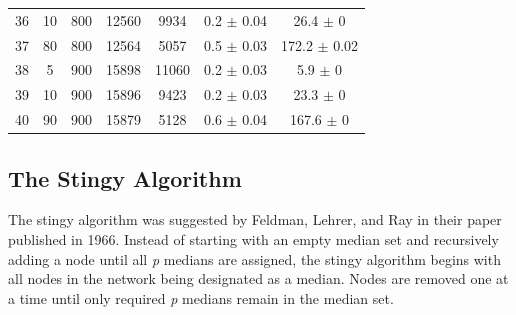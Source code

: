 \documentclass[11pt]{article}
\newcommand{\np}{\newpage}
\begin{document}
\begin{table}[]
{\begin{tabular}{ccccccc}
				36 & 10 & 800 & 12560 & 9934 & 0.2 $\pm$ 0.04 & 26.4 $\pm$ 0 \\
				37 & 80 & 800 & 12564 & 5057 & 0.5 $\pm$ 0.03 & 172.2 $\pm$ 0.02 \\
				\rowcolor[HTML]{EFEFEF} 
				38 & 5 & 900 & 15898 & 11060 & 0.2 $\pm$ 0.03 & 5.9 $\pm$ 0 \\
				\rowcolor[HTML]{EFEFEF} 
				39 & 10 & 900 & 15896 & 9423 & 0.2 $\pm$ 0.03 & 23.3 $\pm$ 0 \\
				\rowcolor[HTML]{EFEFEF} 
				40 & 90 & 900 & 15879 & 5128 & 0.6 $\pm$ 0.04 & 167.6 $\pm$ 0
			\end{tabular}%
		}
	\end{table}
	
	\np
	\subsection{The Stingy Algorithm} \label{stingyalgo}
	The stingy algorithm was suggested by Feldman,  Lehrer,  and Ray  in their paper \cite{FELD66} published in 1966.  
	Instead of starting with an empty median set and recursively adding a node until all \textit{p} medians are assigned, the stingy algorithm begins with all nodes in the network being designated as a median.  Nodes are removed one at a time until only required \textit{p} medians remain in the median set.
	
\end{document}
